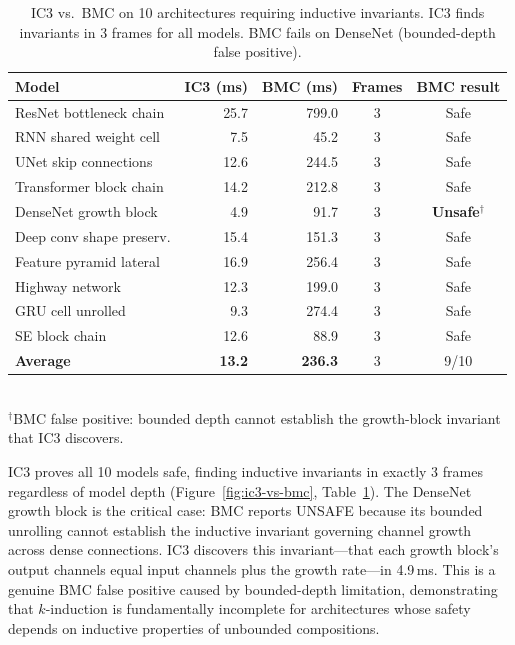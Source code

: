 \documentclass[11pt]{article}
\begin{document}
\begin{table}[t]
\centering
\caption{IC3 vs.\ BMC on 10 architectures requiring inductive invariants.
  IC3 finds invariants in 3 frames for all models.  BMC fails on DenseNet
  (bounded-depth false positive).}
\label{tab:ic3-vs-bmc}
\small
\begin{tabular}{@{}lrrcc@{}}
\toprule
\textbf{Model} & \textbf{IC3 (ms)} & \textbf{BMC (ms)} &
  \textbf{Frames} & \textbf{BMC result} \\
\midrule
ResNet bottleneck chain   & 25.7 & 799.0 & 3 & Safe \\
RNN shared weight cell    &  7.5 &  45.2 & 3 & Safe \\
UNet skip connections     & 12.6 & 244.5 & 3 & Safe \\
Transformer block chain   & 14.2 & 212.8 & 3 & Safe \\
DenseNet growth block     &  4.9 &  91.7 & 3 & \textbf{Unsafe$^\dagger$} \\
Deep conv shape preserv.  & 15.4 & 151.3 & 3 & Safe \\
Feature pyramid lateral   & 16.9 & 256.4 & 3 & Safe \\
Highway network           & 12.3 & 199.0 & 3 & Safe \\
GRU cell unrolled         &  9.3 & 274.4 & 3 & Safe \\
SE block chain            & 12.6 &  88.9 & 3 & Safe \\
\midrule
\textbf{Average}          & \textbf{13.2} & \textbf{236.3} & 3 & 9/10 \\
\bottomrule
\end{tabular}
\\[2pt]
{\footnotesize $^\dagger$BMC false positive: bounded depth cannot establish
the growth-block invariant that IC3 discovers.}
\end{table}

IC3 proves all 10 models safe, finding inductive invariants in exactly
3 frames regardless of model depth (Figure~\ref{fig:ic3-vs-bmc},
Table~\ref{tab:ic3-vs-bmc}).  The DenseNet growth block is the critical
case: BMC reports UNSAFE because its bounded unrolling cannot establish
the inductive invariant governing channel growth across dense connections.
IC3 discovers this invariant---that each growth block's output channels
equal input channels plus the growth rate---in 4.9\,ms.  This is a
genuine BMC false positive caused by bounded-depth limitation, demonstrating
that $k$-induction is fundamentally incomplete for architectures whose
safety depends on inductive properties of unbounded compositions.
\end{document}
